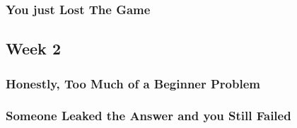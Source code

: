 \documentclass[titlepage=true]{scrartcl}
\begin{document}
    \subsubsection{You just Lost The Game}
	\label{16.1.7}
	
	\newpage
    
    \subsection{Week 2}
    
    \subsubsection{Honestly, Too Much of a Beginner Problem}
	\label{16.2.1}
	
	\newpage

	\subsubsection{Someone Leaked the Answer and you Still Failed}
	\label{16.2.2}
	
	\newpage
\end{document}
